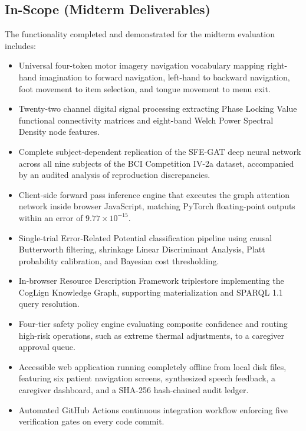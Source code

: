 \documentclass[12pt,a4paper]{report}
\begin{document}
\subsection{In-Scope (Midterm Deliverables)}
The functionality completed and demonstrated for the midterm evaluation includes:
\begin{itemize}[leftmargin=1.5em]
    \item Universal four-token motor imagery navigation vocabulary mapping right-hand imagination to forward navigation, left-hand to backward navigation, foot movement to item selection, and tongue movement to menu exit.
    \item Twenty-two channel digital signal processing extracting Phase Locking Value functional connectivity matrices and eight-band Welch Power Spectral Density node features.
    \item Complete subject-dependent replication of the SFE-GAT deep neural network across all nine subjects of the BCI Competition IV-2a dataset, accompanied by an audited analysis of reproduction discrepancies.
    \item Client-side forward pass inference engine that executes the graph attention network inside browser JavaScript, matching PyTorch floating-point outputs within an error of $9.77 \times 10^{-15}$.
    \item Single-trial Error-Related Potential classification pipeline using causal Butterworth filtering, shrinkage Linear Discriminant Analysis, Platt probability calibration, and Bayesian cost thresholding.
    \item In-browser Resource Description Framework triplestore implementing the CogLign Knowledge Graph, supporting materialization and SPARQL 1.1 query resolution.
    \item Four-tier safety policy engine evaluating composite confidence and routing high-risk operations, such as extreme thermal adjustments, to a caregiver approval queue.
    \item Accessible web application running completely offline from local disk files, featuring six patient navigation screens, synthesized speech feedback, a caregiver dashboard, and a SHA-256 hash-chained audit ledger.
    \item Automated GitHub Actions continuous integration workflow enforcing five verification gates on every code commit.
\end{itemize}
\end{document}
